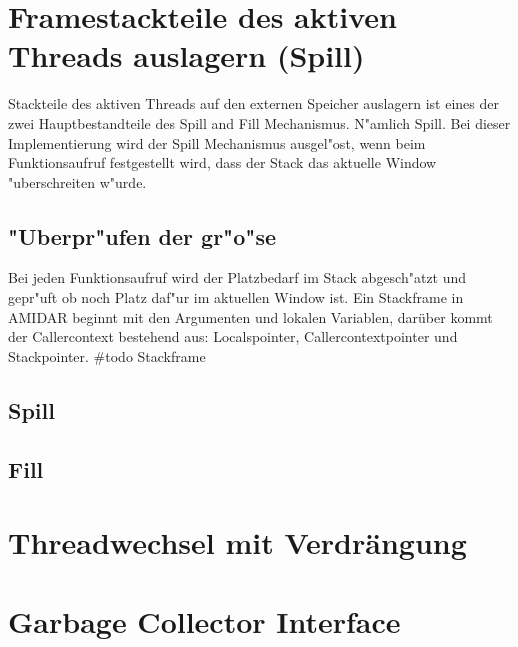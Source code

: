 \section{Framestackteile des aktiven Threads auslagern (Spill)}

Stackteile des aktiven Threads auf den externen Speicher auslagern ist eines der zwei Hauptbestandteile des Spill and Fill Mechanismus. N"amlich Spill. Bei dieser Implementierung wird der Spill Mechanismus ausgel"ost, wenn beim Funktionsaufruf festgestellt wird, dass der Stack das aktuelle Window "uberschreiten w"urde.

\subsection{"Uberpr"ufen der gr"o"se}
Bei jeden Funktionsaufruf wird der Platzbedarf im Stack abgesch"atzt und gepr"uft ob noch Platz daf"ur im aktuellen Window ist. 
Ein Stackframe in AMIDAR beginnt mit den Argumenten und lokalen Variablen, darüber kommt der Callercontext bestehend aus: Localspointer, Callercontextpointer und Stackpointer. 
#todo Stackframe

\subsection{Spill}

\subsection{Fill}

\section{Threadwechsel mit Verdr\"angung}

\section{Garbage Collector Interface}